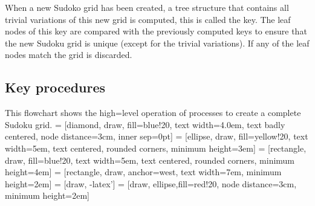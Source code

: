\documentclass[fleqn]{article}
\begin{document}
When a new Sudoko grid has been created, a tree structure that contains all trivial variations of this new grid is computed, this is called the key. The leaf nodes of this key are compared with the previously computed keys to ensure that the new Sudoku grid is unique (except for the trivial variations). If any of the leaf nodes match the grid is discarded.


\subsection{Key procedures}
This flowchart shows the high=level operation of processes to create a complete Sudoku grid.
 = [diamond, draw, fill=blue!20, 
    text width=4.0em, text badly centered, node distance=3cm, inner sep=0pt]
 = [ellipse, draw, fill=yellow!20, 
    text width=5em, text centered, rounded corners, minimum height=3em]
 = [rectangle, draw, fill=blue!20, 
    text width=5em, text centered, rounded corners, minimum height=4em]
 = [rectangle, draw, anchor=west,
    text width=7em, minimum height=2em]
 = [draw, -latex']
 = [draw, ellipse,fill=red!20, node distance=3cm,
    minimum height=2em]
\begin{center}
\end {center}
\end{document}
